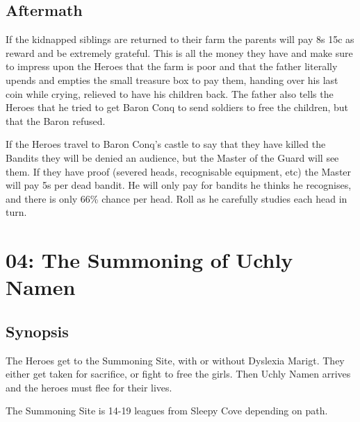 \subsection*{Aftermath}
If the kidnapped siblings are returned to their farm the parents will pay 8s 15c as reward and be extremely grateful. This is all the money they have and make sure to impress upon the Heroes that the farm is poor and that the father literally upends and empties the small treasure box to pay them, handing over his last coin while crying, relieved to have his children back.
The father also tells the Heroes that he tried to get Baron Conq to send soldiers to free the children, but that the Baron refused.

If the Heroes travel to Baron Conq's castle to say that they have killed the Bandits they will be denied an audience, but the Master of the Guard will see them. If they have proof (severed heads, recognisable equipment, etc) the Master will pay 5s per dead bandit. He will only pay for bandits he thinks he recognises, and there is only 66\% chance per head. Roll as he carefully studies each head in turn.













\clearpage
{}
\section*{04: The Summoning of Uchly Namen}


\subsection*{Synopsis}
The Heroes get to the Summoning Site, with or without Dyslexia Marigt. They either get taken for sacrifice, or fight to free the girls. Then Uchly Namen arrives and the heroes must flee for their lives.

The Summoning Site is 14-19 leagues from Sleepy Cove depending on path.


